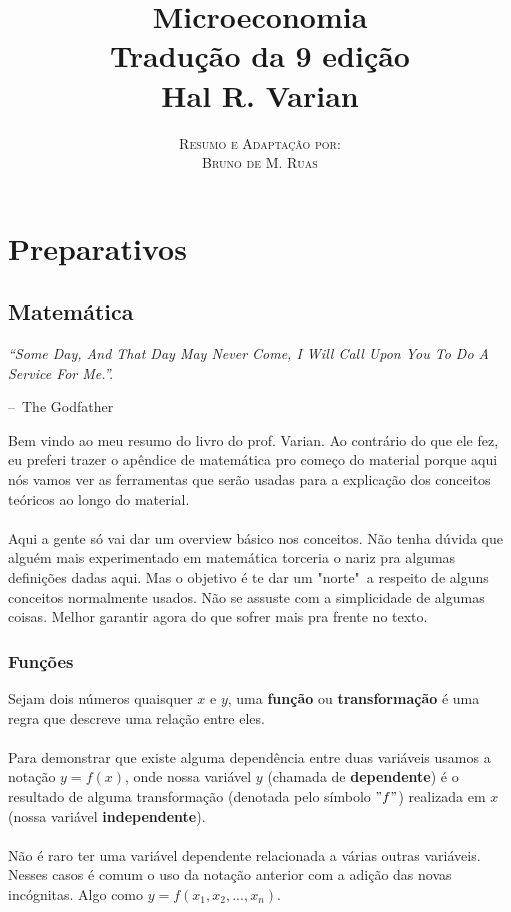 \documentclass[a4paper,11pt,oneside]{book}
\title{\Huge \textbf{Microeconomia} \\ 
\Large Tradução da 9 edição \\
\huge Hal R. Varian}
\author{
\textsc{Resumo e Adaptação por:} \\
\textsc{Bruno de M. Ruas}
}
\makeatletter
\theoremstyle{definition}
\theoremstyle{break}
\newenvironment{chapquote}[2][2em]
  {\setlength{\@tempdima}{#1}%
   \def\chapquote@author{#2}%
   \parshape 1 \@tempdima \dimexpr\textwidth-2\@tempdima\relax%
   \itshape}
  {\par\normalfont\hfill--\ \chapquote@author\hspace*{\@tempdima}\par\bigskip}
\makeatother
\begin{document}
\frontmatter
\maketitle

\tableofcontents

\mainmatter

\part*{Preparativos}

\chapter*{Matemática}

\begin{chapquote}{The Godfather}
	``Some Day, And That Day May Never Come, I Will Call Upon You To Do A Service For Me.''.
\end{chapquote}

Bem vindo ao meu resumo do livro do prof. Varian. Ao contrário do que ele fez, eu preferi trazer o apêndice de matemática pro começo do material porque aqui nós vamos ver as ferramentas que serão usadas para a explicação dos conceitos teóricos ao longo do material.
\\~\\
Aqui a gente só vai dar um overview básico nos conceitos. Não tenha dúvida que alguém mais experimentado em matemática torceria o nariz pra algumas definições dadas aqui. Mas o objetivo é te dar um "norte"\ a respeito de alguns conceitos normalmente usados. Não se assuste com a simplicidade de algumas coisas. Melhor garantir agora do que sofrer mais pra frente no texto.

\section*{Funções}

Sejam dois números quaisquer $x$ e $y$, uma \textbf{função} ou \textbf{transformação} é uma regra que descreve uma relação entre eles.
\\~\\
Para demonstrar que existe alguma dependência entre duas variáveis usamos a notação $y = f(x)$, onde nossa variável $y$ (chamada de \textbf{dependente}) é o resultado de alguma transformação (denotada pelo símbolo $"f"$) realizada em $x$ (nossa variável \textbf{independente}).
\\~\\
Não é raro ter uma variável dependente relacionada a várias outras variáveis. Nesses casos é comum o uso da notação anterior com a adição das novas incógnitas. Algo como $y = f(x_1,x_2,...,x_n)$.
\end{document}
